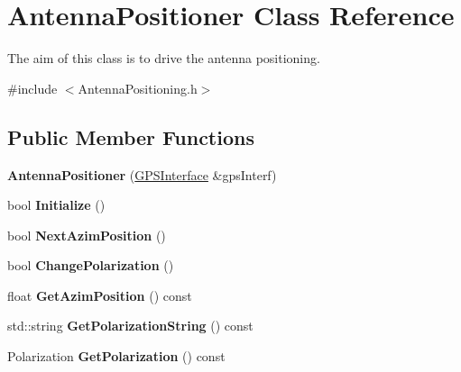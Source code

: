 \hypertarget{classAntennaPositioner}{}\section{Antenna\+Positioner Class Reference}
\label{classAntennaPositioner}


The aim of this class is to drive the antenna positioning.  




{\ttfamily \#include $<$Antenna\+Positioning.\+h$>$}

\subsection*{Public Member Functions}
\begin{DoxyCompactItemize}
\item 
\mbox{\label{classAntennaPositioner_ad7e864f6073421c98585c64802a3e78e}} 
{\bfseries Antenna\+Positioner} (\hyperlink{classGPSInterface}{G\+P\+S\+Interface} \&gps\+Interf)
\item 
\mbox{\label{classAntennaPositioner_a5087caa452709b33082c41b2cef2a23e}} 
bool {\bfseries Initialize} ()
\item 
\mbox{\label{classAntennaPositioner_a2e05c385b9933d2ee1d4f8f953c99070}} 
bool {\bfseries Next\+Azim\+Position} ()
\item 
\mbox{\label{classAntennaPositioner_a0e4f58f67280f2a6daa10c7cc02f0abd}} 
bool {\bfseries Change\+Polarization} ()
\item 
\mbox{\label{classAntennaPositioner_a72cb61d647eaad277f256b3ca9555f8a}} 
float {\bfseries Get\+Azim\+Position} () const
\item 
\mbox{\label{classAntennaPositioner_a897b759fa711bd8a4261e57177e3db1c}} 
std\+::string {\bfseries Get\+Polarization\+String} () const
\item 
\mbox{\label{classAntennaPositioner_a590e07740567be77f677d822cf63b69a}} 
Polarization {\bfseries Get\+Polarization} () const
\item 

\end{DoxyCompactItemize}
